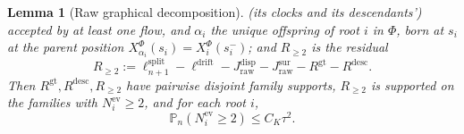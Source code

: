 \documentclass[a4paper,fleqn]{cas-sc}
\newtheorem{lemma}[theorem]{Lemma}
\theoremstyle{definition}
\theoremstyle{remark}
\begin{document}
\begin{lemma}[Raw graphical decomposition]
(its clocks and its descendants') accepted by at least one flow, and $\alpha_i$ the
unique offspring of root $i$ in $\Phi$, born at $s_i$ at the parent position
$X^\Phi_{\alpha_i}(s_i)=X^\Phi_i(s_i^-)$; and $R_{\ge2}$ is the residual
\begin{equation}\label{eq:Rge2-def}
R_{\ge2}:=\ell^{\mathrm{split}}_{n+1}-\ell^{\mathrm{drift}}
-J^{\mathrm{disp}}_{\mathrm{raw}}-J^{\mathrm{sur}}_{\mathrm{raw}}-R^{\mathrm{gt}}-R^{\mathrm{desc}}.
\end{equation}
Then $R^{\mathrm{gt}},R^{\mathrm{desc}},R_{\ge2}$ have pairwise disjoint family supports,
$R_{\ge2}$ is supported on the families with $N^{\mathrm{ev}}_i\ge2$, and for each root
$i$,
\begin{equation}\label{eq:two-event-prob}
\mathbb P_n(N^{\mathrm{ev}}_i\ge2)\le C_K\tau^2.
\end{equation}
\end{lemma}
\end{document}
